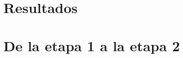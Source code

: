 \section{Resultados}
\label{sec:resultados-e1}

\section{De la etapa 1 a la etapa 2}
\label{sec:puente}
